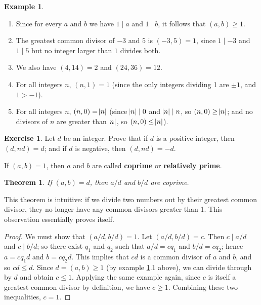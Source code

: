 \documentclass[a4paper,leqno]{article}
\numberwithin{equation}{section}
\newtheorem{thm}[equation]{Theorem}
\theoremstyle{definition}
\newtheorem{ex}[equation]{Example}
\newtheorem{exercise}[equation]{Exercise}
\theoremstyle{remark}
\newcommand{\df}[1]{\textbf{#1}}
\begin{document}
\begin{ex}\leavevmode\label{ex:gcd}
  \begin{enumerate}
    \item Since for every $ a $ and $ b $ we have $ 1 \mid a $ and $ 1 \mid b $, it follows that $ (a,b) \geq 1 $.
    \item The greatest common divisor of $ -3 $ and $ 5 $ is $ (-3, 5) = 1 $, since $ 1 \mid -3 $ and $ 1 \mid 5 $ but no integer larger than $ 1 $ divides both.
    \item We also have $ (4, 14) = 2 $ and $ (24, 36) = 12 $.
    \item For all integers $ n $, $ (n, 1) = 1 $ (since the only integers dividing 1 are $ \pm 1 $, and $ 1 > -1 $).
    \item For all integers $ n $, $ (n, 0) = \abs{n} $ (since $ \abs{n} \mid 0 $ and $ \abs{n} \mid n $, so $ (n,0) \geq \abs{n} $; and no divisors
          of $ n $ are greater than $ \abs{n} $, so $ (n, 0) \leq \abs{n} $).
  \end{enumerate}
\end{ex}

\begin{exercise}
  Let $ d $ be an integer. Prove that if $ d $ is a positive integer, then $ (d, nd) = d $; and if $ d $ is negative, then $ (d, nd) = -d $.
\end{exercise}

If $ (a,b) = 1 $, then $ a $ and $ b $ are called \df{coprime} or \df{relatively prime}.

\begin{thm}
  If $ (a,b) = d $, then $ a/d $ and $ b/d $ are coprime.
\end{thm}
This theorem is intuitive: if we divide two numbers out by their greatest common divisor, they no longer have any common divisors greater than 1. This
observation essentially proves itself.
\begin{proof}
  We must show that $ (a/d, b/d) = 1 $. Let $ (a/d, b/d) = c $. Then $ c \mid a/d $ and $ c \mid b/d $; so there exist $ q_1 $ and $ q_2 $ such
  that $ a/d = cq_1 $ and $ b/d = cq_2 $; hence $ a = cq_1 d $ and $ b = c q_2 d $. This implies that $ cd $ is a common divisor of $ a $ and $ b $,
  and so $ cd \leq d $. Since $ d = (a,b) \geq 1 $ (by example \ref{ex:gcd}.1 above), we can divide through by $ d $ and obtain $ c \leq 1 $. Applying
  the same example again, since $ c $ is itself a greatest common divisor by definition, we have $ c \geq 1 $. Combining these two inequalities, $ c = 1 $.
\end{proof}
\end{document}
